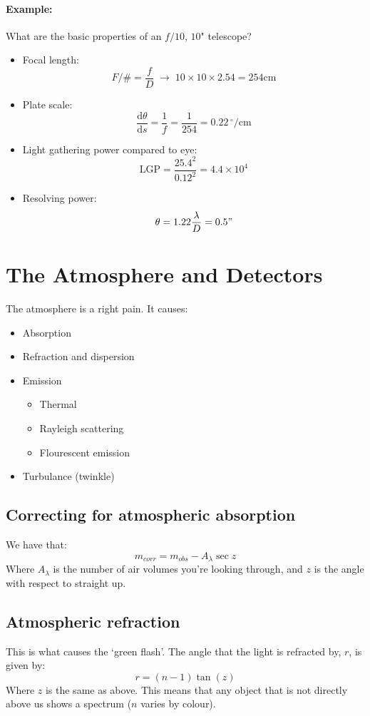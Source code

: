 \paragraph{Example: }What are the basic properties of an $f/10$, $10$"
telescope?
\begin{itemize}
	\item Focal length:
	$$
		F/\# = \frac{f}{D} \; \rightarrow \; 10 \times 10 \times 2.54 = 254
		\mathrm{cm}
	$$
	\item Plate scale:
	$$
		\frac{\mathrm{d}\theta}{\mathrm{d}s} = \frac{1}{f} = \frac{1}{254} = 
		0.22 \, ^\circ / \mathrm{cm}
	$$
	\item Light gathering power compared to eye:
	$$
		\mathrm{LGP} = \frac{25.4^2}{0.12^2} = 4.4\times 10^4
	$$
	\item Resolving power:
	$$
		\theta = 1.22\frac{\lambda}{D} = 0.5 \mathrm{"}
	$$
\end{itemize}

\section{The Atmosphere and Detectors}
The atmosphere is a right pain. It causes:
\begin{itemize}
	\item Absorption
	\item Refraction and dispersion
	\item Emission \begin{itemize}
		\item Thermal
		\item Rayleigh scattering
		\item Flourescent emission
	\end{itemize}
	\item Turbulance (twinkle)
\end{itemize}

\subsection{Correcting for atmospheric absorption}
We have that:
$$
	m_{corr} = m_{obs} - A_\lambda \sec z
$$
Where $A_\lambda$ is the number of air volumes you're looking through, and $z$
is the angle with respect to straight up.

\subsection{Atmospheric refraction}
This is what causes the `green flash'. The angle that the light is refracted by,
$r$, is given by:
$$
	r = (n-1)\tan(z)
$$
Where $z$ is the same as above. This means that any object that is not directly
above us shows a spectrum ($n$ varies by colour).

